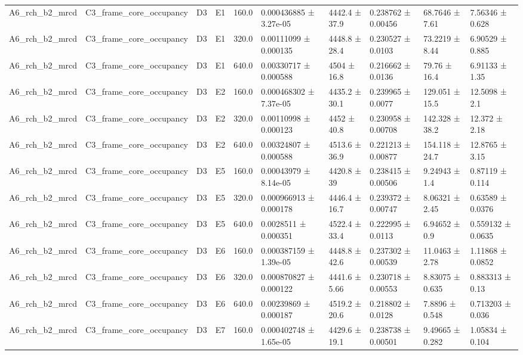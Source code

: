 \begin{table}
\begin{tabular}{llllllllll}
A6\_rch\_b2\_mrcd & C3\_frame\_core\_occupancy & D3 & E1 & 160.0 & 0.000436885 ± 3.27e-05 & 4442.4 ± 37.9 & 0.238762 ± 0.00456 & 68.7646 ± 7.61 & 7.56346 ± 0.628 \\
A6\_rch\_b2\_mrcd & C3\_frame\_core\_occupancy & D3 & E1 & 320.0 & 0.00111099 ± 0.000135 & 4448.8 ± 28.4 & 0.230527 ± 0.0103 & 73.2219 ± 8.44 & 6.90529 ± 0.885 \\
A6\_rch\_b2\_mrcd & C3\_frame\_core\_occupancy & D3 & E1 & 640.0 & 0.00330717 ± 0.000588 & 4504 ± 16.8 & 0.216662 ± 0.0136 & 79.76 ± 16.4 & 6.91133 ± 1.35 \\
A6\_rch\_b2\_mrcd & C3\_frame\_core\_occupancy & D3 & E2 & 160.0 & 0.000468302 ± 7.37e-05 & 4435.2 ± 30.1 & 0.239965 ± 0.0077 & 129.051 ± 15.5 & 12.5098 ± 2.1 \\
A6\_rch\_b2\_mrcd & C3\_frame\_core\_occupancy & D3 & E2 & 320.0 & 0.00110998 ± 0.000123 & 4452 ± 40.8 & 0.230958 ± 0.00708 & 142.328 ± 38.2 & 12.372 ± 2.18 \\
A6\_rch\_b2\_mrcd & C3\_frame\_core\_occupancy & D3 & E2 & 640.0 & 0.00324807 ± 0.000588 & 4513.6 ± 36.9 & 0.221213 ± 0.00877 & 154.118 ± 24.7 & 12.8765 ± 3.15 \\
A6\_rch\_b2\_mrcd & C3\_frame\_core\_occupancy & D3 & E5 & 160.0 & 0.00043979 ± 8.14e-05 & 4420.8 ± 39 & 0.238415 ± 0.00506 & 9.24943 ± 1.4 & 0.87119 ± 0.114 \\
A6\_rch\_b2\_mrcd & C3\_frame\_core\_occupancy & D3 & E5 & 320.0 & 0.000966913 ± 0.000178 & 4446.4 ± 16.7 & 0.239372 ± 0.00747 & 8.06321 ± 2.45 & 0.63589 ± 0.0376 \\
A6\_rch\_b2\_mrcd & C3\_frame\_core\_occupancy & D3 & E5 & 640.0 & 0.0028511 ± 0.000351 & 4522.4 ± 33.4 & 0.222995 ± 0.0113 & 6.94652 ± 0.9 & 0.559132 ± 0.0635 \\
A6\_rch\_b2\_mrcd & C3\_frame\_core\_occupancy & D3 & E6 & 160.0 & 0.000387159 ± 1.39e-05 & 4448.8 ± 42.6 & 0.237302 ± 0.00539 & 11.0463 ± 2.78 & 1.11868 ± 0.0852 \\
A6\_rch\_b2\_mrcd & C3\_frame\_core\_occupancy & D3 & E6 & 320.0 & 0.000870827 ± 0.000122 & 4441.6 ± 5.66 & 0.230718 ± 0.00553 & 8.83075 ± 0.635 & 0.883313 ± 0.13 \\
A6\_rch\_b2\_mrcd & C3\_frame\_core\_occupancy & D3 & E6 & 640.0 & 0.00239869 ± 0.000187 & 4519.2 ± 20.6 & 0.218802 ± 0.0128 & 7.8896 ± 0.548 & 0.713203 ± 0.036 \\
A6\_rch\_b2\_mrcd & C3\_frame\_core\_occupancy & D3 & E7 & 160.0 & 0.000402748 ± 1.65e-05 & 4429.6 ± 19.1 & 0.238738 ± 0.00501 & 9.49665 ± 0.282 & 1.05834 ± 0.104 \\

\end{tabular}
\end{table}
